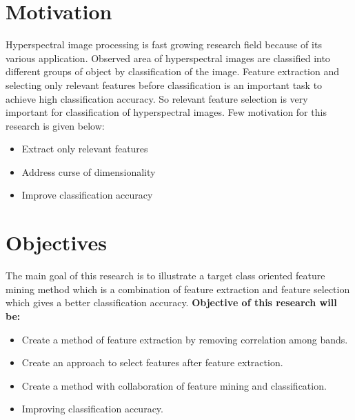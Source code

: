 \documentclass[document.tex]{subfiles}
\begin{document}
\section{Motivation}
\noindent Hyperspectral image processing is fast growing research field because of its various application. Observed area of hyperspectral images are classified into different groups of object by classification of the image. Feature extraction and selecting only relevant features before classification is an important task to achieve high classification accuracy. So relevant feature selection is very important for classification of hyperspectral images. Few motivation for this research is given below:
\begin{itemize}
	\item Extract only relevant features
	\item Address curse of dimensionality
	\item Improve classification accuracy
\end{itemize}

\section{Objectives}
\noindent The main goal of this research is to illustrate a target class oriented feature mining method which is a combination of feature extraction and feature selection which gives a better classification accuracy. 
\clearpage
\textbf{Objective of this research will be:}
\begin{itemize}
	\item Create a method of feature extraction by removing correlation among bands.
	\item Create an approach to select features after feature extraction.
	\item Create a method with collaboration of feature mining and classification.
	\item Improving classification accuracy.
\end{itemize}
\end{document}
